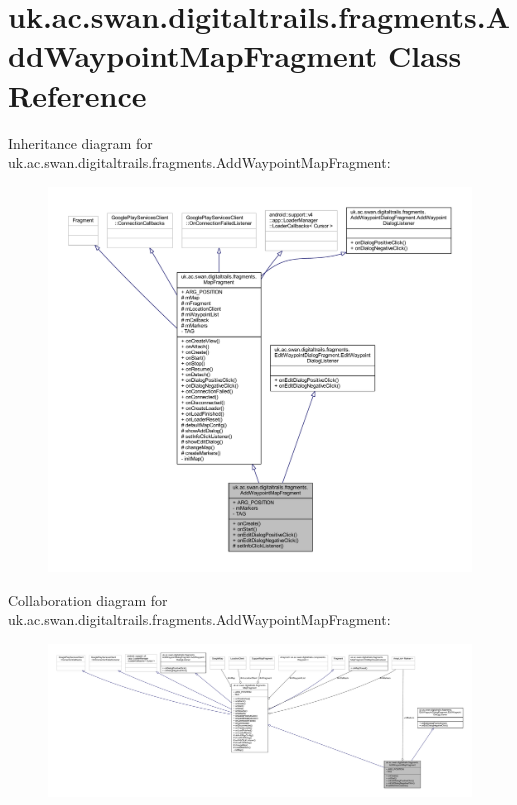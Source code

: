 \hypertarget{classuk_1_1ac_1_1swan_1_1digitaltrails_1_1fragments_1_1_add_waypoint_map_fragment}{\section{uk.\+ac.\+swan.\+digitaltrails.\+fragments.\+Add\+Waypoint\+Map\+Fragment Class Reference}
\label{classuk_1_1ac_1_1swan_1_1digitaltrails_1_1fragments_1_1_add_waypoint_map_fragment}
}


Inheritance diagram for uk.\+ac.\+swan.\+digitaltrails.\+fragments.\+Add\+Waypoint\+Map\+Fragment\+:
\nopagebreak
\begin{figure}[H]
\begin{center}
\leavevmode
\includegraphics[width=350pt]{classuk_1_1ac_1_1swan_1_1digitaltrails_1_1fragments_1_1_add_waypoint_map_fragment__inherit__graph}
\end{center}
\end{figure}


Collaboration diagram for uk.\+ac.\+swan.\+digitaltrails.\+fragments.\+Add\+Waypoint\+Map\+Fragment\+:
\nopagebreak
\begin{figure}[H]
\begin{center}
\leavevmode
\includegraphics[width=350pt]{classuk_1_1ac_1_1swan_1_1digitaltrails_1_1fragments_1_1_add_waypoint_map_fragment__coll__graph}
\end{center}
\end{figure}
